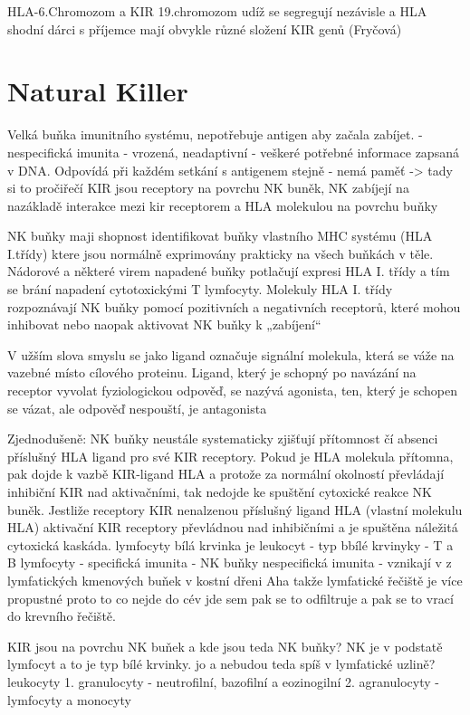 \documentclass[czech,DP]{thesiskiv}
\begin{document}
HLA-6.Chromozom a KIR 19.chromozom
udíž se segregují nezávisle a
HLA shodní dárci s příjemce mají obvykle různé složení KIR genů (Fryčová)

\section{Natural Killer}
Velká buňka imunitního systému, nepotřebuje antigen aby začala zabíjet. 
-nespecifická imunita - vrozená, neadaptivní - veškeré potřebné informace zapsaná v DNA. Odpovídá při každém setkání s antigenem stejně - nemá paměť -> tady si to pročiřečí
KIR jsou receptory na povrchu NK buněk, 
NK zabíjejí na nazákladě interakce mezi kir receptorem a HLA molekulou na povrchu buňky

NK buňky maji shopnost identifikovat buňky vlastního MHC systému (HLA I.třídy) ktere jsou normálně exprimovány prakticky na všech buňkách v těle. 
Nádorové a některé virem napadené buňky potlačují
expresi HLA I. třídy a tím se brání napadení cytotoxickými T lymfocyty.
Molekuly HLA I. třídy rozpoznávají NK buňky pomocí pozitivních a negativních receptorů, které mohou inhibovat nebo naopak aktivovat NK buňky k „zabíjení“

V užším slova smyslu se jako ligand označuje signální molekula, která se váže na vazebné místo cílového proteinu. Ligand, který je schopný po navázání na receptor vyvolat fyziologickou odpověď, se nazývá agonista, ten, který je schopen se vázat, ale odpověď nespouští, je antagonista

Zjednodušeně: NK buňky neustále systematicky zjišťují přítomnost čí absenci příslušný HLA ligand pro své KIR receptory. 
Pokud je HLA molekula přítomna, pak dojde k vazbě KIR-ligand HLA a protože za normální okolností převládají inhibiční KIR nad aktivačními, tak nedojde ke spuštění cytoxické reakce NK buněk. Jestliže receptory KIR nenalzenou příslušný ligand HLA (vlastní molekulu HLA) aktivační KIR receptory převládnou nad inhibičními a je spuštěna náležitá cytoxická kaskáda.
lymfocyty 
bílá krvinka je leukocyt
- typ bbílé krvinyky 
- T a B lymfocyty - specifická imunita
- NK buňky nespecifická imunita
- vznikají v z lymfatických kmenových buňek v kostní dřeni
Aha takže lymfatické řečiště je více propustné proto to co nejde do cév jde sem pak se to odfiltruje a pak se to vrací do krevního řečiště.

KIR jsou na povrchu NK buňek a kde jsou teda NK buňky? 
NK je v podstatě lymfocyt a to je typ bílé krvinky. jo a nebudou teda spíš  v lymfatické uzlině? 
leukocyty 1. granulocyty - neutrofilní, bazofilní a eozinogilní
		2. agranulocyty - lymfocyty a monocyty
		
\end{document}
